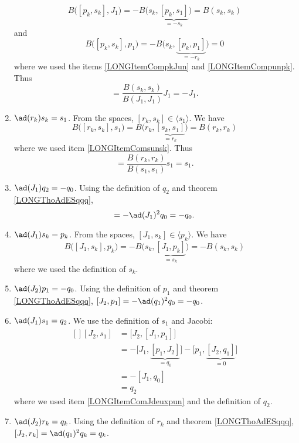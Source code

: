 \begin{enumerate}
		\begin{equation}
			B\big( [p_k,s_k],J_1 \big)=-B\big( s_k,\underbrace{[p_k,s_1]}_{=-s_k} \big)=B(s_k,s_k)
		\end{equation}
		and
		\begin{equation}
			B\big( [p_k,s_k],p_1 \big)=-B\big( s_k,\underbrace{[p_k,p_1]}_{=-r_k} \big)=0
		\end{equation}
		where we used the items \ref{LONGItemCompkJun} and \ref{LONGItemCompunpk}. Thus
		\begin{equation}
			[p_k,s_k]=\frac{ B(s_k,s_k) }{ B(J_1,J_1) }J_1=-J_1.
		\end{equation}
	\item$\ad(r_k)s_k=s_1$. From the spaces, $[r_k,s_k]\in\langle s_1\rangle$. We have
		\begin{equation}
			B\big( [r_k,s_k],s_1 \big)=B\big( r_k,\underbrace{[s_k,s_1]}_{=r_k} \big)=B(r_k,r_k)
		\end{equation}
		where we used item \ref{LONGItemComsunsk}. Thus
		\begin{equation}
			[r_k,s_k]=\frac{ B(r_k,r_k) }{ B(s_1,s_1) }s_1=s_1.
		\end{equation}
	\item$\ad(J_1)q_2=-q_0$. Using the definition of $q_2$ and theorem \ref{LONGThoAdESqqq},
		\begin{equation}
			[J_1,q_2]=-\ad(J_1)^2q_0=-q_0.
		\end{equation}
	\item$\ad(J_1)s_k=p_k$. From the spaces, $[J_1,s_k]\in\langle p_k\rangle$. We have
		\begin{equation}
			B\big( [J_1,s_k],p_k \big)=-B\big( s_k,\underbrace{[J_1,p_k]}_{=s_k} \big)=-B(s_k,s_k)
		\end{equation}
		where we used the definition of $s_k$.
	\item$\ad(J_2)p_1=-q_0$\label{LONGItemComJdeuxpun}. Using the definition of $p_1$ and theorem \ref{LONGThoAdESqqq}, $[J_2,p_1]=-\ad(q_1)^2q_0=-q_0$.
	\item$\ad(J_1)s_1=q_2$. We use the definition of $s_1$ and Jacobi:
		\begin{equation}
			\begin{aligned}[]
				[J_2,s_1]&=\big[ J_2,[J_1,p_1] \big]\\
				&=-\big[ J_1,\underbrace{[p_1,J_2]}_{=q_0} \big]-\big[ p_1,\underbrace{[J_2,q_1]}_{=0} \big]\\
				&=-[J_1,q_0]\\
				&=q_2
			\end{aligned}
		\end{equation}
		where we used item \ref{LONGItemComJdeuxpun} and the definition of $q_2$.
	\item$\ad(J_2)r_k=q_k$. Using the definition of $r_k$ and theorem \ref{LONGThoAdESqqq}, $[J_2,r_k]=\ad(q_1)^2q_k=q_k$.
\end{enumerate}
 
